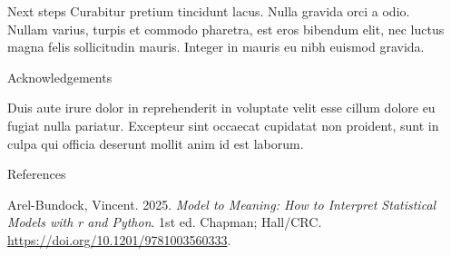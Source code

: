 \documentclass[final]{beamer}
\newlength{\sepwidth}
\newlength{\colwidth}
\newcommand{\separatorcolumn}{\begin{column}{\sepwidth}\end{column}}
\newlength{\cslhangindent}
\newenvironment{CSLReferences}[2] %
 {\begin{list}{}{%
  \setlength{\itemindent}{0pt}
  \setlength{\leftmargin}{0pt}
  \setlength{\parsep}{0pt}
  \ifodd #1
   \setlength{\leftmargin}{\cslhangindent}
   \setlength{\itemindent}{-1\cslhangindent}
  \fi
  \setlength{\itemsep}{#2\baselineskip}}}
 {\end{list}}
\begin{document}
\begin{frame}[t,fragile]
\begin{columns}[t]
\begin{column}{\colwidth}
\begin{block}{Next steps}
Curabitur pretium tincidunt lacus. Nulla gravida orci a odio. Nullam
varius, turpis et commodo pharetra, est eros bibendum elit, nec luctus
magna felis sollicitudin mauris. Integer in mauris eu nibh euismod
gravida.

\end{block}

\begin{block}{Acknowledgements}

Duis aute irure dolor in reprehenderit in voluptate velit esse cillum
dolore eu fugiat nulla pariatur. Excepteur sint occaecat cupidatat non
proident, sunt in culpa qui officia deserunt mollit anim id est laborum.

\end{block}

\begin{block}{References}

\protect{}\label{refs}
\begin{CSLReferences}{1}{1}
Arel-Bundock, Vincent. 2025. \emph{Model to Meaning: How to Interpret
Statistical Models with r and Python}. 1st ed. Chapman; Hall/CRC.
\url{https://doi.org/10.1201/9781003560333}.

\end{CSLReferences}

\end{block}

\end{column}

		\separatorcolumn
	\end{columns}
\end{frame}
\end{document}
